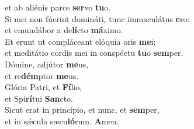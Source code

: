 \oddverse et ab aliénis parce \textbf{ser}vo \textbf{tu}o.\\
\evenverse Si mei non fúerint domináti, tunc immaculátus \textbf{e}ro:~\*\\
\evenverse et emundábor a de\textbf{lí}cto \textbf{má}ximo.\\
\oddverse Et erunt ut compláceant elóquia oris \textbf{me}i:~\*\\
\oddverse et meditátio cordis mei in conspéctu \textbf{tu}o \textbf{sem}per.\\
\evenverse Dómine, adjútor \textbf{me}us,~\*\\
\evenverse et re\textbf{dém}ptor \textbf{me}us.\\
\oddverse Glória Patri, et \textbf{Fí}lio,~\*\\
\oddverse et Spi\textbf{rí}tui \textbf{San}cto.\\
\evenverse Sicut erat in princípio, et nunc, et \textbf{sem}per,~\*\\
\evenverse et in sǽcula sæcu\textbf{ló}rum. \textbf{A}men.\\

